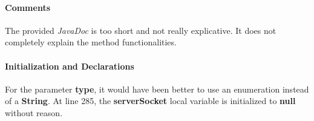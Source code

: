 \paragraph{Comments}
\begin{itemize}
		The provided \textit{JavaDoc} is too short and not really explicative.
		It does not completely explain the method functionalities.
\end{itemize}

\paragraph{Initialization and Declarations}
\begin{itemize}
		For the parameter \textbf{type}, it would have been better to use an enumeration instead of a \textbf{String}.
		At line 285, the \textbf{serverSocket} local variable is initialized to \textbf{null} without reason.
\end{itemize}






